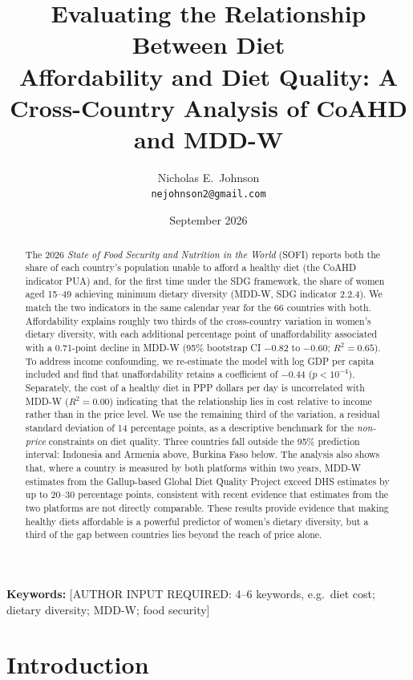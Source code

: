 \documentclass[11pt]{article}
\title{\Large\bfseries Evaluating the Relationship Between Diet \\ Affordability and Diet Quality: A Cross-Country Analysis of CoAHD and MDD-W}
\author{Nicholas E.\ Johnson \\ \small \texttt{nejohnson2@gmail.com}}
\date{September 2026}
\begin{document}
\maketitle

\begin{abstract}
\noindent
The 2026 \emph{State of Food Security and Nutrition in the World} (SOFI) reports both the share of each country's population unable to afford a healthy diet (the CoAHD indicator PUA) and, for the first time under the SDG framework, the share of women aged 15--49 achieving minimum dietary diversity (MDD-W, SDG indicator 2.2.4). We match the two indicators in the same calendar year for the 66 countries with both. Affordability explains roughly two thirds of the cross-country variation in women's dietary diversity, with each additional percentage point of unaffordability associated with a 0.71-point decline in MDD-W (95\% bootstrap CI $-0.82$ to $-0.60$; $R^2=0.65$). To address income confounding, we re-estimate the model with log GDP per capita included and find that unaffordability retains a coefficient of $-0.44$ ($p<10^{-4}$). Separately, the cost of a healthy diet in PPP dollars per day is uncorrelated with MDD-W ($R^2=0.00$) indicating that the relationship lies in cost relative to income rather than in the price level.  We use the remaining third of the variation, a residual standard deviation of 14 percentage points, as a descriptive benchmark for the \emph{non-price} constraints on diet quality. Three countries fall outside the 95\% prediction interval: Indonesia and Armenia above, Burkina Faso below. The analysis also shows that, where a country is measured by both platforms within two years, MDD-W estimates from the Gallup-based Global Diet Quality Project exceed DHS estimates by up to 20--30 percentage points, consistent with recent evidence that estimates from the two platforms are not directly comparable. These results provide evidence that making healthy diets affordable is a powerful predictor of women's dietary diversity, but a third of the gap between countries lies beyond the reach of price alone.
\end{abstract}

\medskip
\noindent\textbf{Keywords:} [AUTHOR INPUT REQUIRED: 4--6 keywords, e.g.\ diet cost; dietary diversity; MDD-W; food security]

\section{Introduction}\label{sec:intro}
\end{document}
